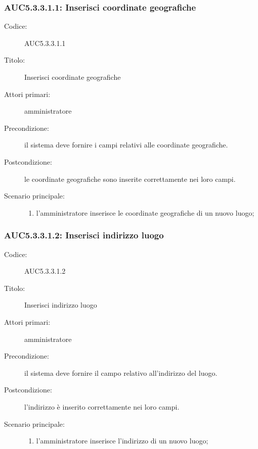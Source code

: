 \documentclass[../../../analisi-dei-requisiti.tex]{subfiles}
\begin{document}
\subsubsection{AUC5.3.3.1.1: Inserisci coordinate geografiche}%
\label{subs:AUC5.3.3.1.1}
\begin{description}
  \item[Codice:] AUC5.3.3.1.1
  \item[Titolo:] Inserisci coordinate geografiche
  \item[Attori primari:] amministratore
  \item[Precondizione:] il sistema deve fornire i campi relativi alle coordinate geografiche.
  \item[Postcondizione:] le coordinate geografiche sono inserite correttamente nei loro campi.
  \item[Scenario principale:]
  \begin{enumerate}
    \item l'amministratore inserisce le coordinate geografiche di un nuovo luogo;
  \end{enumerate}
\end{description}

\subsubsection{AUC5.3.3.1.2: Inserisci indirizzo luogo}%
\label{subs:AUC5.3.3.1.2}
\begin{description}
  \item[Codice:] AUC5.3.3.1.2
  \item[Titolo:] Inserisci indirizzo luogo
  \item[Attori primari:] amministratore
  \item[Precondizione:] il sistema deve fornire il campo relativo all'indirizzo del luogo.
  \item[Postcondizione:] l'indirizzo è inserito correttamente nei loro campi.
  \item[Scenario principale:]
  \begin{enumerate}
    \item l'amministratore inserisce l'indirizzo di un nuovo luogo;
  \end{enumerate}
\end{description}
\end{document}
